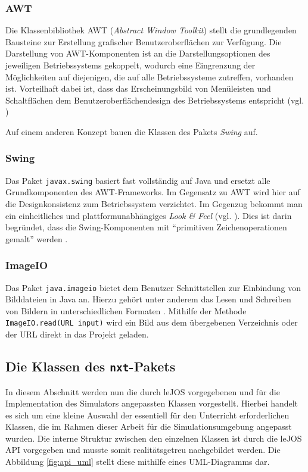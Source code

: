 \documentclass[paper=a4, DIV=calc, BCOR=12mm, twoside=on, onecolumn=on, open = right, titlepage =on, parskip =half-, headsepline = on, footsepline = off, chapterprefix = off, appendixprefix = on, fontsize = 12pt, numbers = noenddot, abstract = on]{scrbook}
\begin{document}
\subsubsection*{AWT}

Die Klassenbibliothek AWT (\emph{Abstract Window Toolkit}) stellt die grundlegenden Bausteine zur Erstellung grafischer Benutzeroberflächen zur Verfügung. Die Darstellung von AWT-Komponenten ist an die Darstellungsoptionen des jeweiligen Betriebssystems gekoppelt, wodurch eine Eingrenzung der Möglichkeiten auf diejenigen, die auf alle Betriebssysteme zutreffen, vorhanden ist. Vorteilhaft dabei ist, dass das Erscheinungsbild von Menüleisten und Schaltflächen dem Benutzeroberflächendesign des Betriebssystems entspricht (vgl. \cite[S.279]{abts:15})

Auf einem anderen Konzept bauen die Klassen des Pakets \emph{Swing} auf. 

\subsubsection*{Swing}

Das Paket \texttt{javax.swing} basiert fast vollständig auf Java und ersetzt alle Grundkomponenten des AWT-Frameworks. Im Gegensatz zu AWT wird hier auf die Designkonsistenz zum Betriebssystem verzichtet. Im Gegenzug bekommt man ein einheitliches und plattformunabhängiges \emph{Look \& Feel} (vgl. \cite[S.279]{abts:15}). Dies ist darin begründet, dass die Swing-Komponenten mit "`primitiven Zeichenoperationen gemalt"' werden \cite[S.1018]{ullenboom:12}.


\subsubsection*{ImageIO}

Das Paket \texttt{java.imageio} bietet dem Benutzer Schnittstellen zur Einbindung von Bilddateien in Java an. Hierzu gehört unter anderem das Lesen und Schreiben von Bildern in unterschiedlichen Formaten \cite[S.1280]{ullenboom:12}. Mithilfe der Methode \texttt{ImageIO.read(URL input)} wird ein Bild aus dem übergebenen Verzeichnis oder der URL direkt in das Projekt geladen. 


\par \singlespacing
\subsection{Die Klassen des \texttt{nxt}-Pakets}
\label{sec:API}
\onehalfspacing
In diesem Abschnitt werden nun die durch leJOS vorgegebenen und für die Implementation des Simulators angepassten Klassen vorgestellt. Hierbei handelt es sich um eine kleine Auswahl der essentiell für den Unterricht erforderlichen Klassen, die im Rahmen dieser Arbeit für die Simulationsumgebung angepasst wurden. Die interne Struktur zwischen den einzelnen Klassen ist durch die leJOS API vorgegeben und musste somit realitätsgetreu nachgebildet werden. Die Abbildung \ref{fig:api_uml} stellt diese mithilfe eines UML-Diagramms dar.
\end{document}
